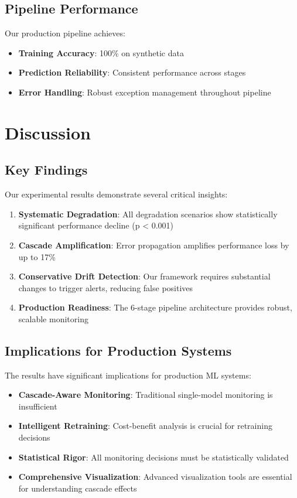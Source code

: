 \documentclass{article}
\begin{document}
\subsection{Pipeline Performance}

Our production pipeline achieves:
\begin{itemize}
    \item \textbf{Training Accuracy}: 100\% on synthetic data
    \item \textbf{Prediction Reliability}: Consistent performance across stages
    \item \textbf{Error Handling}: Robust exception management throughout pipeline
\end{itemize}

\section{Discussion}

\subsection{Key Findings}

Our experimental results demonstrate several critical insights:

\begin{enumerate}
    \item \textbf{Systematic Degradation}: All degradation scenarios show statistically significant performance decline (p < 0.001)
    \item \textbf{Cascade Amplification}: Error propagation amplifies performance loss by up to 17\%
    \item \textbf{Conservative Drift Detection}: Our framework requires substantial changes to trigger alerts, reducing false positives
    \item \textbf{Production Readiness}: The 6-stage pipeline architecture provides robust, scalable monitoring
\end{enumerate}

\subsection{Implications for Production Systems}

The results have significant implications for production ML systems:

\begin{itemize}
    \item \textbf{Cascade-Aware Monitoring}: Traditional single-model monitoring is insufficient
    \item \textbf{Intelligent Retraining}: Cost-benefit analysis is crucial for retraining decisions
    \item \textbf{Statistical Rigor}: All monitoring decisions must be statistically validated
    \item \textbf{Comprehensive Visualization}: Advanced visualization tools are essential for understanding cascade effects
\end{itemize}
\end{document}
